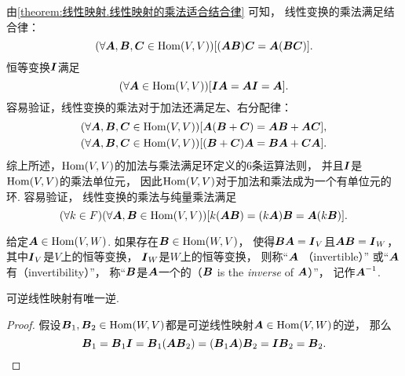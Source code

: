 由\cref{theorem:线性映射.线性映射的乘法适合结合律} 可知，
线性变换的乘法满足结合律：\begin{equation*}
	(\forall\vb{A},\vb{B},\vb{C}\in\Hom(V,V))
	[
		(\vb{A}\vb{B})\vb{C}
		= \vb{A}(\vb{B}\vb{C})
	].
\end{equation*}
恒等变换\(\vb{I}\)满足\begin{equation*}
	(\forall\vb{A}\in\Hom(V,V))
	[\vb{I}\vb{A}=\vb{A}\vb{I}=\vb{A}].
\end{equation*}
容易验证，线性变换的乘法对于加法还满足左、右分配律：\begin{gather*}
	(\forall\vb{A},\vb{B},\vb{C}\in\Hom(V,V))
	[\vb{A}(\vb{B}+\vb{C})=\vb{A}\vb{B}+\vb{A}\vb{C}], \\
	(\forall\vb{A},\vb{B},\vb{C}\in\Hom(V,V))
	[(\vb{B}+\vb{C})\vb{A}=\vb{B}\vb{A}+\vb{C}\vb{A}].
\end{gather*}
综上所述，\(\Hom(V,V)\)的加法与乘法满足环定义的6条运算法则，
并且\(\vb{I}\)是\(\Hom(V,V)\)的乘法单位元，
因此\(\Hom(V,V)\)对于加法和乘法成为一个有单位元的环.
容易验证，
线性变换的乘法与纯量乘法满足\begin{equation*}
	(\forall k\in F)
	(\forall\vb{A},\vb{B}\in\Hom(V,V))
	[
		k(\vb{A}\vb{B})
		=(k\vb{A})\vb{B}
		=\vb{A}(k\vb{B})
	].
\end{equation*}

\begin{definition}
给定\(\vb{A}\in\Hom(V,W)\).
如果存在\(\vb{B}\in\Hom(W,V)\)，
使得\(\vb{B}\vb{A}=\vb{I}_V\)且\(\vb{A}\vb{B}=\vb{I}_W\)，
其中\(\vb{I}_V\)是\(V\)上的恒等变换，
\(\vb{I}_W\)是\(W\)上的恒等变换，
则称“\(\vb{A}\) （invertible）”
或“\(\vb{A}\)有（invertibility）”，
称“\(\vb{B}\)是\(\vb{A}\)一个的（\(\vb{B}\) is the \emph{inverse} of \(\vb{A}\)）”，
记作\(\vb{A}^{-1}\).
\end{definition}
\begin{proposition}\label{theorem:线性映射.可逆线性映射有唯一逆}
可逆线性映射有唯一逆.
\begin{proof}
假设\(\vb{B}_1,\vb{B}_2\in\Hom(W,V)\)都是可逆线性映射\(\vb{A}\in\Hom(V,W)\)的逆，
那么\begin{equation*}
	\vb{B}_1 = \vb{B}_1 \vb{I}
	= \vb{B}_1 (\vb{A} \vb{B}_2)
	= (\vb{B}_1 \vb{A}) \vb{B}_2
	= \vb{I} \vb{B}_2
	= \vb{B}_2.
	\qedhere
\end{equation*}
\end{proof}
\end{proposition}


